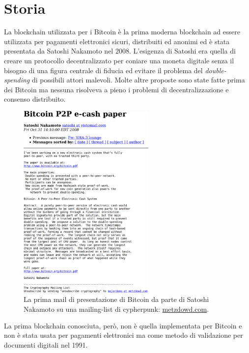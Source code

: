 \section{Storia}
La blockchain utilizzata per i Bitcoin è la prima moderna blockchain ad essere utilizzata per pagamenti elettronici sicuri, distribuiti ed anonimi ed è stata presentata da Satoshi Nakamoto nel 2008. L'esigenza di Satoshi era quella di creare un protocollo decentralizzato per coniare una moneta digitale senza il bisogno di una figura centrale di fiducia ed evitare il problema del \textit{double-spending} di possibili attori malevoli.
Molte altre proposte sono state fatte prima dei Bitcoin ma nessuna risolveva a pieno i problemi di decentralizzazione e consenso distribuito.
\begin{figure}
    \centering
    \includegraphics[width=0.6\textwidth]{images/satoshimail.png}
    \caption{La prima mail di presentazione di Bitcoin da parte di Satoshi Nakamoto su una mailing-list di cypherpunk: \href{metzdowd.com}{metzdowd.com}.}
\end{figure}

La prima blockchain conosciuta, però, non è quella implementata per Bitcoin e non è stata usata per pagamenti elettronici ma come metodo di validazione per documenti digitali nel 1991.

